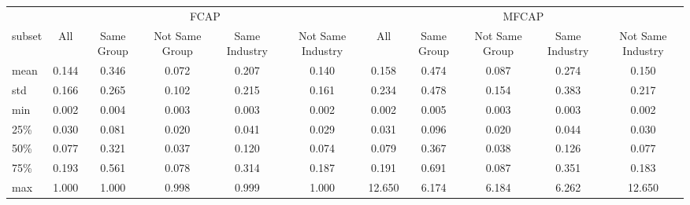 \begin{tabular}{lcccccccccc}
\toprule
 & \multicolumn{5}{c}{FCAP} & \multicolumn{5}{c}{MFCAP} \\
\cmidrule(lr){2-6}\cmidrule(lr){7-11}
subset &    All & Same Group & Not Same Group & Same Industry & Not Same Industry &     All & Same Group & Not Same Group & Same Industry & Not Same Industry \\
\hline
mean &  0.144 &      0.346 &          0.072 &         0.207 &             0.140 &   0.158 &      0.474 &          0.087 &         0.274 &             0.150 \\
std  &  0.166 &      0.265 &          0.102 &         0.215 &             0.161 &   0.234 &      0.478 &          0.154 &         0.383 &             0.217 \\
min  &  0.002 &      0.004 &          0.003 &         0.003 &             0.002 &   0.002 &      0.005 &          0.003 &         0.003 &             0.002 \\
25\%  &  0.030 &      0.081 &          0.020 &         0.041 &             0.029 &   0.031 &      0.096 &          0.020 &         0.044 &             0.030 \\
50\%  &  0.077 &      0.321 &          0.037 &         0.120 &             0.074 &   0.079 &      0.367 &          0.038 &         0.126 &             0.077 \\
75\%  &  0.193 &      0.561 &          0.078 &         0.314 &             0.187 &   0.191 &      0.691 &          0.087 &         0.351 &             0.183 \\
max  &  1.000 &      1.000 &          0.998 &         0.999 &             1.000 &  12.650 &      6.174 &          6.184 &         6.262 &            12.650 \\
\bottomrule
\end{tabular}
